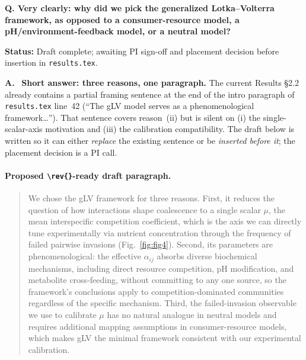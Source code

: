\documentclass[11pt]{article}
\newcommand{\question}[1]{%
    \par\vspace{0.4em}\noindent%
    {\color{blue!70!black}\textbf{Q. #1}}\par\smallskip%
}
\newcommand{\answerlabel}{\par\noindent\textbf{A.}\ }
\newcommand{\statusmark}[1]{{\color{red!70!black}\textbf{Status:} #1}\par}
\providecommand{\figref}[1]{Fig.~\ref{#1}}
\begin{document}
\question{Very clearly: why did we pick the generalized Lotka--Volterra framework, as opposed to a consumer-resource model, a pH/environment-feedback model, or a neutral model?}
\statusmark{Draft complete; awaiting PI sign-off and placement decision before insertion in \texttt{results.tex}.}

\answerlabel
\textbf{Short answer: three reasons, one paragraph.} The current Results \S2.2 already contains a partial framing sentence at the end of the intro paragraph of \texttt{results.tex} line~42 (``The gLV model serves as a phenomenological framework\ldots''). That sentence covers reason~(ii) but is silent on (i) the single-scalar-axis motivation and (iii) the calibration compatibility. The draft below is written so it can either \emph{replace} the existing sentence or be \emph{inserted before it}; the placement decision is a PI call.

\paragraph{Proposed \texttt{\textbackslash rev\{\}}-ready draft paragraph.}
\begin{quote}
\color{blue!70!black}
We chose the gLV framework for three reasons. First, it reduces the question of how interactions shape coalescence to a single scalar $\mu$, the mean interspecific competition coefficient, which is the axis we can directly tune experimentally via nutrient concentration through the frequency of failed pairwise invasions (\figref{fig:fig4}). Second, its parameters are phenomenological: the effective $\alpha_{ij}$ absorbs diverse biochemical mechanisms, including direct resource competition, pH modification, and metabolite cross-feeding, without committing to any one source, so the framework's conclusions apply to competition-dominated communities regardless of the specific mechanism. Third, the failed-invasion observable we use to calibrate $\mu$ has no natural analogue in neutral models and requires additional mapping assumptions in consumer-resource models, which makes gLV the minimal framework consistent with our experimental calibration.
\end{quote}
\end{document}
